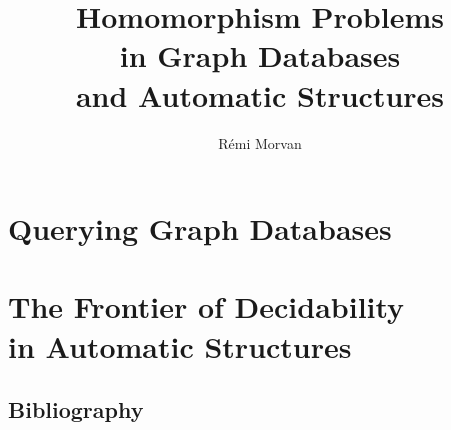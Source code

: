 \documentclass[a4paper,sfsidenotes,twoside,justified,nobib]{tufte-book-custom}
\title[Homomorphism Problems]{Homomorphism Problems\\in Graph Databases\\ and Automatic Structures}
\author{Rémi Morvan}
\begin{document}


\frontmatter


\renewcommand\thefigure{P.\arabic{figure}}



\mainmatter

% 
% 

\renewcommand\thefigure{\thechapter.\arabic{figure}}




\part{Querying Graph Databases}
\label{part:databases}







\part[The Frontier of Decidability in Automatic Structures]{The Frontier of Decidability\\in Automatic Structures}
\label{part:automatic}






\begin{fullwidth}
	\let\clearpage\null
	\let\cleardoublepage\null
	\chapter*{Bibliography}
	\setlength{\columnsep}{8mm}
	\begin{multicols}{2}
		\printbibliography[heading=none]
	\end{multicols}
\end{fullwidth}

\printindex


\end{document}
